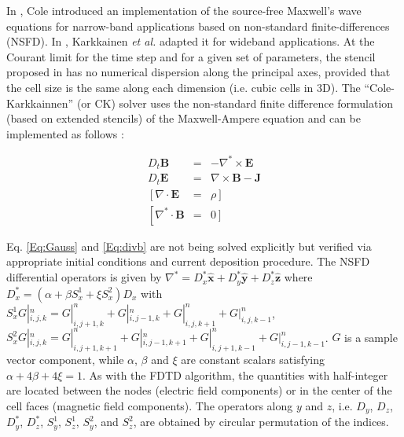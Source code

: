 

In \cite{Coleieee1997,Coleieee2002}, Cole introduced an implementation
of the source-free Maxwell's wave equations for narrow-band applications
based on non-standard finite-differences (NSFD). In \cite{Karkicap06},
Karkkainen \emph{et al.} adapted it for wideband applications. At
the Courant limit for the time step and for a given set of parameters,
the stencil proposed in \cite{Karkicap06} has no numerical dispersion
along the principal axes, provided that the cell size is the same
along each dimension (i.e. cubic cells in 3D). The ``Cole-Karkkainnen''
(or CK) solver uses the non-standard finite difference formulation
(based on extended stencils) of the Maxwell-Ampere equation and can be 
implemented as follows \cite{Vayjcp2011}:

\begin{subequations}
\begin{eqnarray}
D_{t}\mathbf{B} & = & -\nabla^{*}\times\mathbf{E}\label{Eq:Faraday}\\
D_{t}\mathbf{E} & = & \nabla\times\mathbf{B}-\mathbf{J}\label{Eq:Ampere}\\
\left[\nabla\cdot\mathbf{E}\right. & = & \left.\rho\right]\label{Eq:Gauss}\\
\left[\nabla^{*}\cdot\mathbf{B}\right. & = & \left.0\right]\label{Eq:divb}
\end{eqnarray}
\end{subequations}

Eq. \ref{Eq:Gauss} and \ref{Eq:divb} are not being solved explicitly
but verified via appropriate initial conditions and current deposition
procedure. The NSFD differential operators is given by $\nabla^{*}=D_{x}^{*}\mathbf{\hat{x}}+D_{y}^{*}\mathbf{\hat{y}}+D_{z}^{*}\mathbf{\hat{z}}$
where $D_{x}^{*}=\left(\alpha+\beta S_{x}^{1}+\xi S_{x}^{2}\right)D_{x}$
with $S_{x}^{1}G|_{i,j,k}^{n}=G|_{i,j+1,k}^{n}+G|_{i,j-1,k}^{n}+G|_{i,j,k+1}^{n}+G|_{i,j,k-1}^{n}$,
$S_{x}^{2}G|_{i,j,k}^{n}=G|_{i,j+1,k+1}^{n}+G|_{i,j-1,k+1}^{n}+G|_{i,j+1,k-1}^{n}+G|_{i,j-1,k-1}^{n}$.
$G$ is a sample vector component, while $\alpha$, $\beta$ and $\xi$
are constant scalars satisfying $\alpha+4\beta+4\xi=1$. As with
the FDTD algorithm, the quantities with half-integer are located between
the nodes (electric field components) or in the center of the cell
faces (magnetic field components). The operators along $y$ and $z$,
i.e. $D_{y}$, $D_{z}$, $D_{y}^{*}$, $D_{z}^{*}$, $S_{y}^{1}$,
$S_{z}^{1}$, $S_{y}^{2}$, and $S_{z}^{2}$, are obtained by circular
permutation of the indices.

